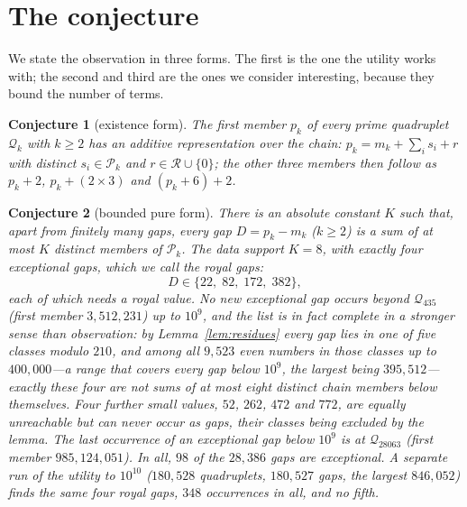 \documentclass[11pt,a4paper]{article}
\newtheorem{conjecture}{Conjecture}
\newcommand{\Q}{\mathcal{Q}}
\newcommand{\Pool}{\mathcal{P}}
\newcommand{\R}{\mathcal{R}}
\begin{document}
\section{The conjecture}
\label{sec:conj}

We state the observation in three forms. The first is the one the utility
works with; the second and third are the ones we consider interesting,
because they bound the number of terms.

\begin{conjecture}[existence form]
\label{conj:A}
The first member $p_k$ of every prime quadruplet $\Q_k$ with $k\ge2$ has an
additive representation over the chain: $p_k=m_k+\sum_i s_i+r$ with
distinct $s_i\in\Pool_k$ and $r\in\R\cup\{0\}$; the other three members
then follow as $p_k+2$, $p_k+(2\times3)$ and $(p_k+6)+2$.
\end{conjecture}

\begin{conjecture}[bounded pure form]
\label{conj:B}
There is an absolute constant $K$ such that, apart from finitely many gaps,
every gap $D=p_k-m_k$ ($k\ge2$) is a sum of at most $K$ distinct members of
$\Pool_k$. The data support $K=8$, with exactly four exceptional gaps, which
we call the \emph{royal gaps}:
\[
D\in\{22,\;82,\;172,\;382\},
\]
each of which needs a royal value. No \emph{new} exceptional gap occurs
beyond $\Q_{435}$ (first member $3{,}512{,}231$) up to $10^9$, and the list
is in fact complete in a stronger sense than observation: by
Lemma~\ref{lem:residues} every gap lies in one of five classes modulo
$210$, and among all $9{,}523$ even numbers in those classes up to
$400{,}000$---a range that covers every gap below $10^9$, the largest being
$395{,}512$---exactly these four are not sums of at most eight distinct
chain members below themselves. Four further small values, $52$, $262$,
$472$ and $772$, are equally unreachable but can never occur as gaps, their
classes being excluded by the lemma. The last occurrence of an exceptional
gap below $10^9$ is at $\Q_{28063}$ (first member $985{,}124{,}051$). In
all, $98$ of the $28{,}386$ gaps are exceptional. A separate run of the
utility to $10^{10}$ ($180{,}528$ quadruplets, $180{,}527$ gaps, the
largest $846{,}052$) finds the same four royal gaps, $348$ occurrences in
all, and no fifth.
\end{conjecture}
\end{document}

